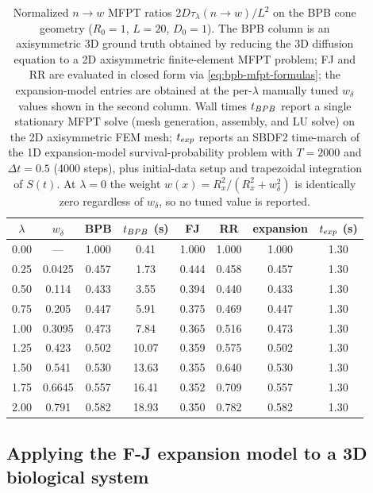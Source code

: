 \documentclass[11pt]{article}
\begin{document}
\begin{table}[h]
    \centering
    \begin{tabular}{c|c|cc|ccc|c}
        $\lambda$ & $w_\delta$ & BPB \cite{BPB2007} & $t_{\rm BPB}$ (s) & FJ & RR & expansion & $t_{\rm exp}$ (s) \\
        \hline
        0.00 & ---    & 1.000 & 0.41  & 1.000 & 1.000 & 1.000 & 1.30 \\
        0.25 & 0.0425 & 0.457 & 1.73  & 0.444 & 0.458 & 0.457 & 1.30 \\
        0.50 & 0.114  & 0.433 & 3.55  & 0.394 & 0.440 & 0.433 & 1.30 \\
        0.75 & 0.205  & 0.447 & 5.91  & 0.375 & 0.469 & 0.447 & 1.30 \\
        1.00 & 0.3095 & 0.473 & 7.84  & 0.365 & 0.516 & 0.473 & 1.30 \\
        1.25 & 0.423  & 0.502 & 10.07 & 0.359 & 0.575 & 0.502 & 1.30 \\
        1.50 & 0.541  & 0.530 & 13.63 & 0.355 & 0.640 & 0.530 & 1.30 \\
        1.75 & 0.6645 & 0.557 & 16.41 & 0.352 & 0.709 & 0.557 & 1.30 \\
        2.00 & 0.791  & 0.582 & 18.93 & 0.350 & 0.782 & 0.582 & 1.30 \\
    \end{tabular}
    \caption{Normalized $n \to w$ MFPT ratios $2 D \tau_\lambda(n \to w)/L^2$ on the BPB cone geometry ($R_0 = 1$, $L = 20$, $D_0 = 1$). The BPB column is an axisymmetric 3D ground truth obtained by reducing the 3D diffusion equation to a 2D axisymmetric finite-element MFPT problem; FJ and RR are evaluated in closed form via \eqref{eq:bpb-mfpt-formulas}; the expansion-model entries are obtained at the per-$\lambda$ manually tuned $w_\delta$ values shown in the second column. Wall times $t_{\rm BPB}$ report a single stationary MFPT solve (mesh generation, assembly, and LU solve) on the 2D axisymmetric FEM mesh; $t_{\rm exp}$ reports an SBDF2 time-march of the 1D expansion-model survival-probability problem with $T = 2000$ and $\Delta t = 0.5$ (4000 steps), plus initial-data setup and trapezoidal integration of $S(t)$. At $\lambda = 0$ the weight $w(x) = R_x^2/(R_x^2 + w_\delta^2)$ is identically zero regardless of $w_\delta$, so no tuned value is reported.}
    \label{tab:bpb-benchmark}
\end{table}


\subsection{Applying the F-J expansion model to a 3D biological system}
\end{document}
